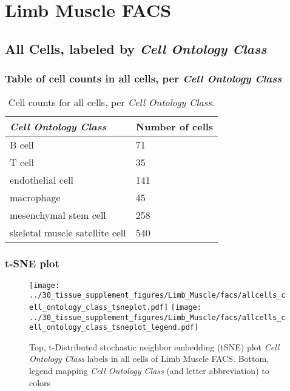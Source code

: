 \clearpage
\section{Limb Muscle FACS}

\subsection{All Cells, labeled by \emph{Cell Ontology Class}}
\subsubsection{Table of cell counts in all cells, per \emph{Cell Ontology Class}}\begin{table}[h]
\centering
\label{my-label}
\begin{tabular}{@{}ll@{}}
\toprule

\emph{Cell Ontology Class}& Number of cells \\ \midrule
B cell & 71 \\

T cell & 35 \\

endothelial cell & 141 \\

macrophage & 45 \\

mesenchymal stem cell & 258 \\

skeletal muscle satellite cell & 540 \\
\bottomrule
\end{tabular}
\caption{Cell counts for all cells, per \emph{Cell Ontology Class}.}
\end{table}

\clearpage
\subsubsection{t-SNE plot}
\begin{figure}[h]
\centering
\texttt{[image: ../30\_tissue\_supplement\_figures/Limb\_Muscle/facs/allcells\_cell\_ontology\_class\_tsneplot.pdf]}
\texttt{[image: ../30\_tissue\_supplement\_figures/Limb\_Muscle/facs/allcells\_cell\_ontology\_class\_tsneplot\_legend.pdf]}
\caption{Top, t-Distributed stochastic neighbor embedding (tSNE) plot  \emph{Cell Ontology Class} labels in all cells of Limb Muscle FACS. Bottom, legend mapping \emph{Cell Ontology Class} (and letter abbreviation) to colors}
\end{figure}


